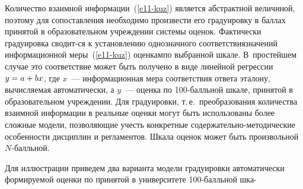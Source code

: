 \begin{multicols}{2}
     Количество взаимной информации~(\ref{e11-kuz}) является абстрактной 
величиной, поэтому для со\-по\-став\-ле\-ния необходимо произвести его градуировку в 
баллах принятой в образовательном учреждении системы оценок. Фактически 
градуировка сводит-\linebreak ся к установлению однозначного соответствия\linebreak значений 
информационной меры~(\ref{e11-kuz}) оценкам\linebreak по выбранной шкале. 
В~простейшем случае это соответствие может быть получено в виде линейной 
регрессии $y\hm=a \hm+ bx$, где $x$~--- информационная мера соответствия ответа 
эталону, вычисля\-емая автоматически, а $y$~--- оценка по 100-балль\-ной шкале, 
принятой в образовательном учреждении. Для градуировки, т.\,е.\ преобразования 
количества взаимной информации в реальные оценки могут быть использованы 
более сложные модели, поз\-во\-ля\-ющие учесть конкретные со\-дер\-жа\-тель\-но-ме\-то\-ди\-че\-ские 
особенности дисциплин и регламентов. Шкала оценок может быть 
произвольной $N$-балль\-ной. 


     
     Для иллюстрации приведем два варианта модели градуировки автоматически 
формируемой оценки по принятой в университете 100-балль\-ной шка-\linebreak\vspace*{-12pt}

\end{multicols}

